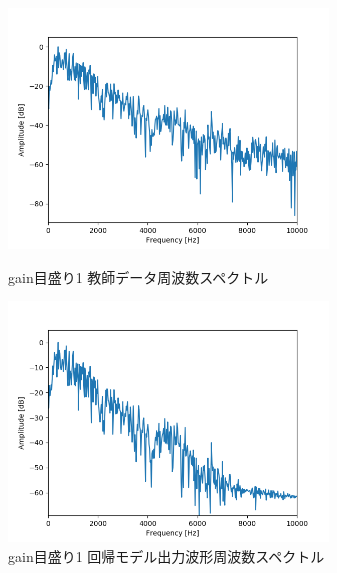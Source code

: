 \documentclass{jreport}		%
\begin{document}
\begin{figure}[htbp]
 \begin{minipage}{0.5\hsize}
  \begin{center}
   \includegraphics[width=85mm]{gain1_fft.png}
  \end{center}
  \caption{gain目盛り1 教師データ周波数スペクトル}
  \label{fig:one}
 \end{minipage}
 \begin{minipage}{0.5\hsize}
  \begin{center}
   \includegraphics[width=85mm]{gain1_predict_fft.png}
  \end{center}
  \caption{gain目盛り1 回帰モデル出力波形周波数スペクトル}
  \label{fig:two}
 \end{minipage}
\end{figure}
\end{document}
